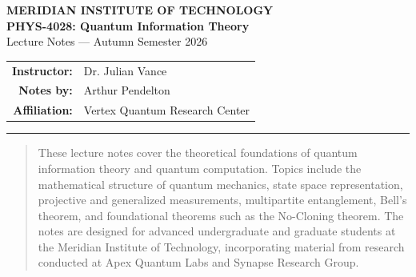 \documentclass[11pt,oneside,a4paper]{report}
\begin{document}
\begin{center}
    \sffamily
    {\large\bfseries\color{accent}MERIDIAN INSTITUTE OF TECHNOLOGY} \\
    \vspace{0.5em}
    {\Huge\bfseries\color{primary}PHYS-4028: Quantum Information Theory} \\
    \vspace{0.8em}
    {\large\color{slate600}Lecture Notes --- Autumn Semester 2026} \\
    \vspace{1.5em}
    \begin{tabular}{rl}
        \textbf{Instructor:} & Dr. Julian Vance \\
        \textbf{Notes by:} & Arthur Pendelton \\
        \textbf{Affiliation:} & Vertex Quantum Research Center
    \end{tabular}
    \vspace{2.5em}
    {\color{secondary}\hrule height 1.5pt}
\end{center}

\vspace{1.5em}

\begin{abstract}
    These lecture notes cover the theoretical foundations of quantum information theory and quantum computation. Topics include the mathematical structure of quantum mechanics, state space representation, projective and generalized measurements, multipartite entanglement, Bell's theorem, and foundational theorems such as the No-Cloning theorem. The notes are designed for advanced undergraduate and graduate students at the Meridian Institute of Technology, incorporating material from research conducted at Apex Quantum Labs and Synapse Research Group.
\end{abstract}

\vspace{2em}
\tableofcontents
\newpage






\newpage
\nocite{*}


\end{document}
